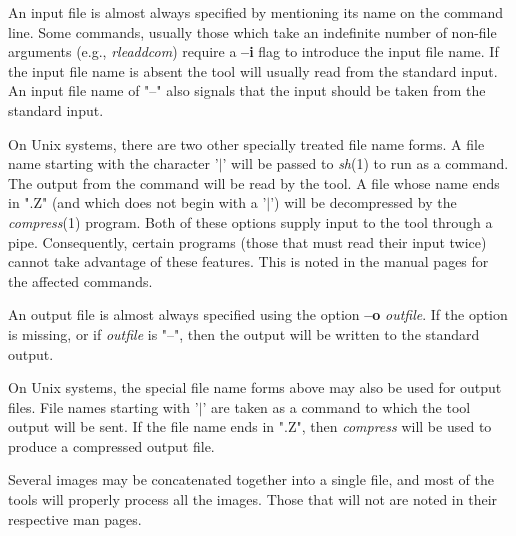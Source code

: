 An input file is almost always specified by mentioning its name on the
command line.  Some commands, usually those which take an indefinite
number of non-file arguments (e.g.,
{\it rleaddcom}{\rm )}
require a
{\bf --i}
flag to introduce the input file name.
If the input file name is absent the tool will usually
read from the standard input.  An input file name of "--" also signals
that the input should be taken from the standard input.

On Unix
systems, there are two other specially treated file name forms.  A
file name starting with the character '$|$' will be passed to
{\it sh}{\rm (1)}
to run as a command.  The output from the command will be read by the
tool.  A file whose name ends in ".Z" (and which does not begin with
a '$|$') will be decompressed by the
{\it compress}{\rm (1)}
program.  Both of these options supply input to the tool through a
pipe.  Consequently, certain programs (those that must read their
input twice) cannot take advantage of these features.  This is noted
in the manual pages for the affected commands.

An output file is almost always specified using the option
{\bf --o}
{\it outfile}{\rm .}
If the option is missing, or if 
{\it outfile}
is "--", then the output will be written to the standard output.

On Unix systems, the special file name forms above may also be used
for output files.  File names starting with '$|$' are taken as a command
to which the tool output will be sent.  If the file name ends in ".Z",
then
{\it compress}
will be used to produce a compressed output file.

Several images may be concatenated together into a single file, and
most of the tools will properly process all the images.  Those that
will not are noted in their respective man pages.

